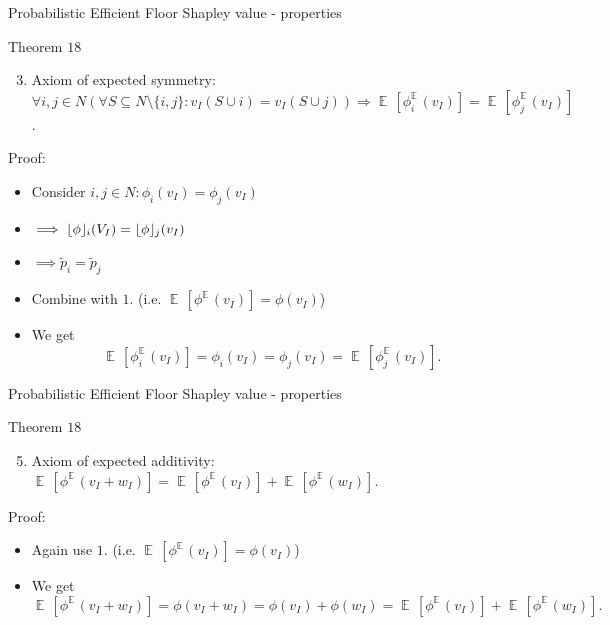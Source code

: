 \documentclass{beamer}
\newcommand{\floor}[1]{\left\lfloor #1 \right\rfloor}
\newcommand{\floorphi}{\ensuremath{\floor{\phi}\hspace{-0.5ex}}}
\DeclareMathOperator{\E}{\mathbb{E}\,}
\begin{document}
\begin{frame}{Probabilistic Efficient Floor Shapley value - properties}
    \begin{block}{Theorem $18$}
        \begin{enumerate}
            \setcounter{enumi}{2}
            \item Axiom of expected symmetry: $\forall i,j \in N (\forall S \subseteq N \setminus \{i,j\}: v_I(S \cup i) = v_I(S \cup j)) \Rightarrow \E[\phi_{i}^{\E}(v_I)] = \E[\phi_{j}^{\E}(v_I)]$.
        \end{enumerate}
    \end{block}

    Proof:

    \begin{itemize}
        \item Consider $i,j \in N: \phi_i(v_I) = \phi_j(v_I)$
        \item $\implies \floorphi_i(V_I) = \floorphi_j(v_I)$
        \item $\implies \tilde{p}_i = \tilde{p}_j$
        \item Combine with $1.$ (i.e. $\E[\phi^{\E}(v_I)] = \phi(v_I)$)
        \item We get
        \begin{displaymath}
            \E[\phi_{i}^{\E}(v_I)] = \phi_i(v_I) = \phi_j(v_I) = \E[\phi_{j}^{\E}(v_I)].
        \end{displaymath}
    \end{itemize}

\end{frame}



\begin{frame}{Probabilistic Efficient Floor Shapley value - properties}
    \begin{block}{Theorem $18$}
        \begin{enumerate}
            \setcounter{enumi}{4}
            \item Axiom of expected additivity: $\E[\phi^{\E}(v_I+w_I)] = \E[\phi^{\E}(v_I)] + \E[\phi^{\E}(w_I)]$.
        \end{enumerate}
    \end{block}

    Proof:

    \begin{itemize}

        \item Again use $1.$ (i.e. $\E[\phi^{\E}(v_I)] = \phi(v_I)$)
        \item We get
        \begin{displaymath}
            \E[\phi^{\E}(v_I+w_I)] = \phi(v_I+w_I) = \phi(v_I) + \phi(w_I) = \E[\phi^{\E}(v_I)] + \E[\phi^{\E}(w_I)].
        \end{displaymath}
    \end{itemize}

\end{frame}
\end{document}
